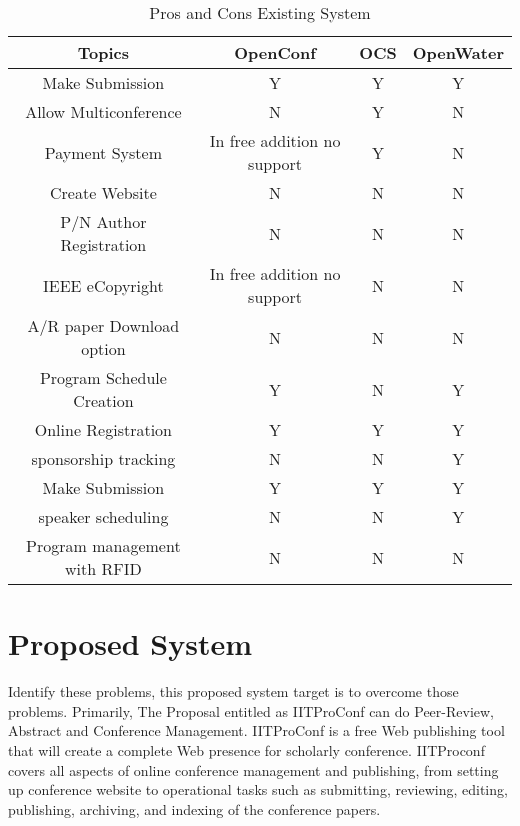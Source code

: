 \begin{center}
\begin{table}[htbp]
   \begin{tabular}{|c|c|c|c|}
     \hline
     Topics & OpenConf & OCS & OpenWater \\\hline
     Make Submission & Y & Y & Y \\\hline
     Allow Multiconference & N & Y & N \\\hline
     Payment System & In free addition no support & Y & N \\\hline
     Create Website  & N & N & N \\\hline
     P/N Author Registration & N & N & N \\\hline
     IEEE eCopyright & In free addition no support & N & N \\\hline
     A/R paper Download option & N & N & N \\\hline
     Program  Schedule Creation & Y & N & Y \\\hline
     Online Registration & Y & Y & Y \\\hline
     sponsorship tracking & N & N & Y \\
     Make Submission & Y & Y & Y \\\hline
     speaker scheduling & N & N & Y \\\hline
     Program management with RFID & N & N & N \\\hline


   \end{tabular}
   \caption[Pros and Cons Existing System.]{Pros and Cons Existing System}
	\label{tab:pros cons}

  \end{table}
  \end{center}


\section{Proposed  System }
Identify these problems, this proposed system target is to overcome those problems. Primarily, The Proposal entitled as IITProConf can do Peer-Review, Abstract and Conference Management. IITProConf is a free Web publishing tool that will create a complete Web presence for scholarly conference.
IITProconf covers all aspects of online conference management and publishing, from setting up conference website to operational tasks such as submitting, reviewing, editing, publishing, archiving, and indexing of the conference papers.

